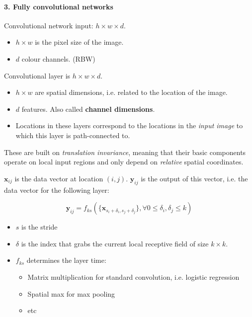 \documentclass[]{article}
\let\oldparagraph\paragraph
\renewcommand{\paragraph}[1]{\oldparagraph{#1}\mbox{}}
\begin{document}
\paragraph{3. Fully convolutional networks}\label{header-n47}

Convolutional network input: \(h \times w \times d\).

\begin{itemize}
\item
  \(h \times w\) is the pixel size of the image.
\item
  \(d\) colour channels. (RBW)
\end{itemize}

Convolutional layer is \(h \times w \times d\).

\begin{itemize}
\item
  \(h \times w\) are spatial dimensions, i.e. related to the location of
  the image.
\item
  \(d\) features. Also called \textbf{channel dimensions}.
\item
  Locations in these layers correspond to the locations in the
  \emph{input image} to which this layer is path-connected to.
\end{itemize}

These are built on \emph{translation invariance}, meaning that their
basic components operate on local input regions and only depend on
\emph{relative} spatial coordinates.

\(\mathbf x_{ij}\) is the data vector at location \((i, j)\).
\(\mathbf y_{ij}\) is the output of this vector, i.e. the data vector
for the following layer:

\[\mathbf y_{ij} = f_{ks}(\{\mathbf x_{s_i + \delta_i,s_j + \delta_j}\}, \forall  0 \leq \delta_i , \delta_j \leq k)\]

\begin{itemize}
\item
  \(s\) is the stride
\item
  \(\delta\) is the index that grabs the current local receptive field
  of size \(k \times k\).
\item
  \(f_{ks}\) determines the layer time:

  \begin{itemize}
  \item
    Matrix multiplication for standard convolution, i.e. logistic
    regression
  \item
    Spatial max for max pooling
  \item
    etc
  \end{itemize}
\end{itemize}
\end{document}
